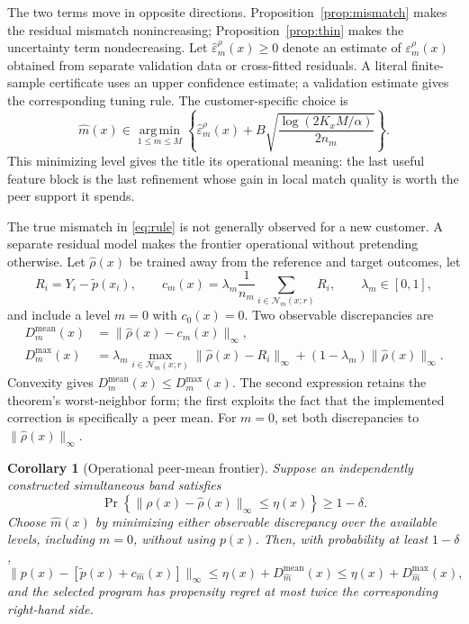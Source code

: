 \documentclass[11pt]{article}
\theoremstyle{noteplain}
\newtheorem{corollary}[theorem]{Corollary}
\theoremstyle{definition}
\newcommand{\cN}{\mathcal N}
\newcommand{\argmin}{\operatorname*{arg\,min}}
\begin{document}
The two terms move in opposite directions. Proposition~\ref{prop:mismatch} makes the residual mismatch nonincreasing; Proposition~\ref{prop:thin} makes the uncertainty term nondecreasing. Let $\widehat\varepsilon_m^\rho(x)\geq0$ denote an estimate of $\varepsilon_m^\rho(x)$ obtained from separate validation data or cross-fitted residuals. A literal finite-sample certificate uses an upper confidence estimate; a validation estimate gives the corresponding tuning rule. The customer-specific choice is
\begin{equation}\label{eq:rule}
 \widehat m(x)\in\argmin_{1\leq m\leq M}
 \left\{\widehat\varepsilon_m^\rho(x)
 +B\sqrt{\frac{\log(2K_xM/\alpha)}{2n_m}}\right\}.
\end{equation}
This minimizing level gives the title its operational meaning: the last useful feature block is the last refinement whose gain in local match quality is worth the peer support it spends.

The true mismatch in \eqref{eq:rule} is not generally observed for a new customer. A separate residual model makes the frontier operational without pretending otherwise. Let $\widehat\rho(x)$ be trained away from the reference and target outcomes, let
\[
 R_i=Y_i-\widetilde p(x_i),\qquad
 c_m(x)=\lambda_m\frac{1}{n_m}\sum_{i\in\cN_m(x;r)}R_i,
 \qquad \lambda_m\in[0,1],
\]
and include a level $m=0$ with $c_0(x)=0$. Two observable discrepancies are
\begin{align*}
 D_m^{\mathrm{mean}}(x)
 &=\|\widehat\rho(x)-c_m(x)\|_\infty,\\
 D_m^{\max}(x)
 &=\lambda_m\max_{i\in\cN_m(x;r)}
   \|\widehat\rho(x)-R_i\|_\infty
   +(1-\lambda_m)\|\widehat\rho(x)\|_\infty.
\end{align*}
Convexity gives $D_m^{\mathrm{mean}}(x)\leq D_m^{\max}(x)$. The second expression retains the theorem's worst-neighbor form; the first exploits the fact that the implemented correction is specifically a peer mean.
For $m=0$, set both discrepancies to $\|\widehat\rho(x)\|_\infty$.

\begin{corollary}[Operational peer-mean frontier]\label{cor:operational}
Suppose an independently constructed simultaneous band satisfies
\[
 \Pr\!\left\{\|\rho(x)-\widehat\rho(x)\|_\infty\leq\eta(x)\right\}
 \geq1-\delta.
\]
Choose $\widehat m(x)$ by minimizing either observable discrepancy over the available levels, including $m=0$, without using $p(x)$. Then, with probability at least $1-\delta$,
\[
 \|p(x)-[\widetilde p(x)+c_{\widehat m}(x)]\|_\infty
 \leq \eta(x)+D_{\widehat m}^{\mathrm{mean}}(x)
 \leq \eta(x)+D_{\widehat m}^{\max}(x),
\]
and the selected program has propensity regret at most twice the corresponding right-hand side.
\end{corollary}
\end{document}
